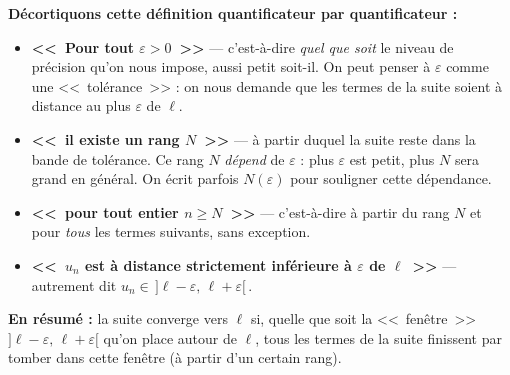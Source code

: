 \documentclass[12pt,a4paper,openany]{book}
\theoremstyle{definition}
\newcommand{\N}{\mathbb{N}}
\newcommand{\eps}{\varepsilon}
\newcommand{\abs}[1]{\left\lvert #1 \right\rvert}
\begin{document}
\medskip

\noindent\textbf{Décortiquons cette définition quantificateur par quantificateur :}

\begin{itemize}[leftmargin=2cm]
  \item[\boldmath$\forall\, \eps > 0$] \textbf{<<~Pour tout $\eps > 0$~>>} --- c'est-à-dire
    \emph{quel que soit} le niveau de précision qu'on nous impose, aussi petit soit-il.
    On peut penser à $\eps$ comme une <<~tolérance~>> : on nous demande que les termes
    de la suite soient à distance au plus $\eps$ de $\ell$.

  \item[\boldmath$\exists\, N \in \N$] \textbf{<<~il existe un rang $N$~>>} --- à partir
    duquel la suite reste dans la bande de tolérance. Ce rang $N$ \emph{dépend} de $\eps$ :
    plus $\eps$ est petit, plus $N$ sera grand en général. On écrit parfois $N(\eps)$ pour
    souligner cette dépendance.

  \item[\boldmath$\forall\, n \geq N$] \textbf{<<~pour tout entier $n \geq N$~>>} --- c'est-à-dire
    à partir du rang $N$ et pour \emph{tous} les termes suivants, sans exception.

  \item[\boldmath$\abs{u_n - \ell} < \eps$] \textbf{<<~$u_n$ est à distance strictement
    inférieure à $\eps$ de $\ell$~>>} --- autrement dit $u_n \in \,]\ell - \eps,\, \ell + \eps[\,$.
\end{itemize}

\medskip

\noindent\textbf{En résumé :} la suite converge vers $\ell$ si, quelle que soit la
<<~fenêtre~>> $]\ell - \eps,\, \ell + \eps[$ qu'on place autour de $\ell$, tous les
termes de la suite finissent par tomber dans cette fenêtre (à partir d'un certain rang).

\bigskip
\end{document}
